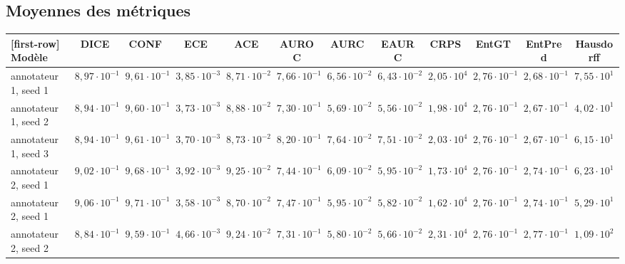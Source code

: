 \documentclass[a4paper,french,bookmarks,12pt]{article}
\begin{document}
    \begin{landscape}
        \subsection*{Moyennes des métriques}
        
        \begin{center}
            \centering
            \footnotesize
            \begin{NiceTabular}{lccccccccccc}[first-row]
            \toprule
            \textbf{Modèle} & \textbf{DICE} & \textbf{CONF} & \textbf{ECE} & \textbf{ACE} & \textbf{AUROC} & \textbf{AURC} & \textbf{EAURC} & \textbf{CRPS} & \textbf{EntGT} & \textbf{EntPred} & \textbf{Hausdorff} \\
            \midrule
            annotateur 1, seed 1& $8{,}97 \cdot 10^{-1}$ & $9{,}61 \cdot 10^{-1}$ & $3{,}85 \cdot 10^{-3}$ & $8{,}71 \cdot 10^{-2}$ & $7{,}66 \cdot 10^{-1}$ & $6{,}56 \cdot 10^{-2}$ & $6{,}43 \cdot 10^{-2}$ & $2{,}05 \cdot 10^{4}$ & $2{,}76 \cdot 10^{-1}$ & $2{,}68 \cdot 10^{-1}$ & $7{,}55 \cdot 10^{1}$ \\
            annotateur 1, seed 2 & $8{,}94 \cdot 10^{-1}$ & $9{,}60 \cdot 10^{-1}$ & $3{,}73 \cdot 10^{-3}$ & $8{,}88 \cdot 10^{-2}$ & $7{,}30 \cdot 10^{-1}$ & $5{,}69 \cdot 10^{-2}$ & $5{,}56 \cdot 10^{-2}$ & $1{,}98 \cdot 10^{4}$ & $2{,}76 \cdot 10^{-1}$ & $2{,}67 \cdot 10^{-1}$ & $4{,}02 \cdot 10^{1}$ \\
            annotateur 1, seed 3 & $8{,}94 \cdot 10^{-1}$ & $9{,}61 \cdot 10^{-1}$ & $3{,}70 \cdot 10^{-3}$ & $8{,}73 \cdot 10^{-2}$ & \textbf{$8{,}20 \cdot 10^{-1}$} & $7{,}64 \cdot 10^{-2}$ & $7{,}51 \cdot 10^{-2}$ & $2{,}03 \cdot 10^{4}$ & $2{,}76 \cdot 10^{-1}$ & $2{,}67 \cdot 10^{-1}$ & $6{,}15 \cdot 10^{1}$ \\
            annotateur 2, seed 1 & $9{,}02 \cdot 10^{-1}$ & $9{,}68 \cdot 10^{-1}$ & $3{,}92 \cdot 10^{-3}$ & $9{,}25 \cdot 10^{-2}$ & $7{,}44 \cdot 10^{-1}$ & $6{,}09 \cdot 10^{-2}$ & $5{,}95 \cdot 10^{-2}$ & $1{,}73 \cdot 10^{4}$ & $2{,}76 \cdot 10^{-1}$ & $2{,}74 \cdot 10^{-1}$ & $6{,}23 \cdot 10^{1}$ \\
            annotateur 2, seed 1 & \textbf{$9{,}06 \cdot 10^{-1}$} & \textbf{$9{,}71 \cdot 10^{-1}$} & $3{,}58 \cdot 10^{-3}$ & $8{,}70 \cdot 10^{-2}$ & $7{,}47 \cdot 10^{-1}$ & $5{,}95 \cdot 10^{-2}$ & $5{,}82 \cdot 10^{-2}$ & $1{,}62 \cdot 10^{4}$ & $2{,}76 \cdot 10^{-1}$ & $2{,}74 \cdot 10^{-1}$ & $5{,}29 \cdot 10^{1}$ \\
            annotateur 2, seed 2 & $8{,}84 \cdot 10^{-1}$ & $9{,}59 \cdot 10^{-1}$ & $4{,}66 \cdot 10^{-3}$ & $9{,}24 \cdot 10^{-2}$ & $7{,}31 \cdot 10^{-1}$ & $5{,}80 \cdot 10^{-2}$ & $5{,}66 \cdot 10^{-2}$ & $2{,}31 \cdot 10^{4}$ & $2{,}76 \cdot 10^{-1}$ & $2{,}77 \cdot 10^{-1}$ & $1{,}09 \cdot 10^{2}$ \\

\end{NiceTabular}
\end{center}
\end{landscape}
\end{document}
